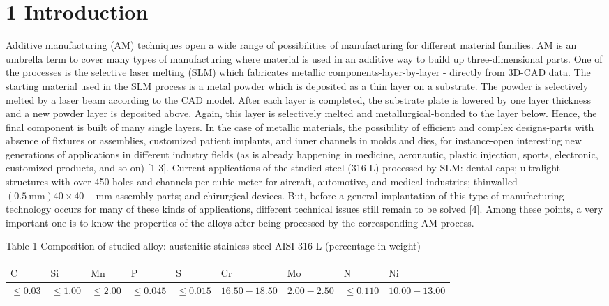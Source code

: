\documentclass[10pt]{article}
\begin{document}
\section*{1 Introduction}
Additive manufacturing (AM) techniques open a wide range of possibilities of manufacturing for different material families. AM is an umbrella term to cover many types of manufacturing where material is used in an additive way to build up three-dimensional parts. One of the processes is the selective laser melting (SLM) which fabricates metallic components-layer-by-layer - directly from 3D-CAD data. The starting material used in the SLM process is a metal powder which is deposited as a thin layer on a substrate. The powder is selectively melted by a laser beam according to the CAD model. After each layer is completed, the substrate plate is lowered by one layer thickness and a new powder layer is deposited above. Again, this layer is selectively melted and metallurgical-bonded to the layer below. Hence, the final component is built of many single layers. In the case of metallic materials, the possibility of efficient and complex designs-parts with absence of fixtures or assemblies, customized patient implants, and inner channels in molds and dies, for instance-open interesting new generations of applications in different industry fields (as is already happening in medicine, aeronautic, plastic injection, sports, electronic, customized products, and so on) [1-3]. Current applications of the studied steel (316 L) processed by SLM: dental caps; ultralight structures with over 450 holes and channels per cubic meter for aircraft, automotive, and medical industries; thinwalled $(0.5 \mathrm{~mm}) 40 \times 40-\mathrm{mm}$ assembly parts; and chirurgical devices. But, before a general implantation of this type of manufacturing technology occurs for many of these kinds of applications, different technical issues still remain to be solved [4]. Among these points, a very important one is to know the properties of the alloys after being processed by the corresponding AM process.

Table 1 Composition of studied alloy: austenitic stainless steel AISI 316 L (percentage in weight)

\begin{center}
\begin{tabular}{lllllllll}
\hline
$\mathrm{C}$ & $\mathrm{Si}$ & $\mathrm{Mn}$ & $\mathrm{P}$ & $\mathrm{S}$ & $\mathrm{Cr}$ & $\mathrm{Mo}$ & $\mathrm{N}$ & $\mathrm{Ni}$ \\
\hline
$\leq 0.03$ & $\leq 1.00$ & $\leq 2.00$ & $\leq 0.045$ & $\leq 0.015$ & $16.50-18.50$ & $2.00-2.50$ & $\leq 0.110$ & $10.00-13.00$ \\
\hline
\end{tabular}
\end{center}
\end{document}
